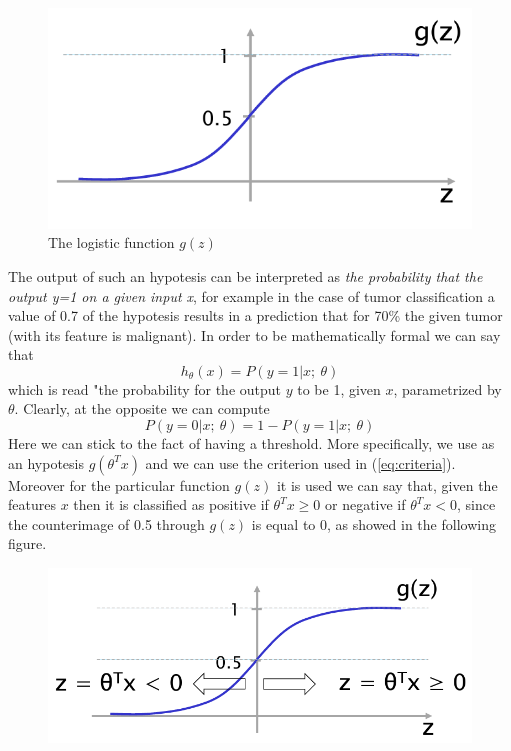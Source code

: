 \begin{figure}[h]
    \centering
    \includegraphics[scale=0.7]{img/logit.png}
    \caption{The logistic function $g(z)$}
\end{figure}

The output of such an hypotesis can be interpreted as \textit{the probability that the output y=1 on a given input x}, for example in the case of tumor classification a value of 0.7 of the hypotesis results in a prediction that for 70\% the given tumor (with its feature is malignant). In order to be mathematically formal we can say that 
\begin{equation}
    h_\theta(x)=P(y=1 | x; \ \theta )
\end{equation}
which is read "the probability for the output $y$ to be 1, given $x$, parametrized by $\theta$. Clearly, at the opposite we can compute
\begin{equation}
    P(y=0 | x; \ \theta) = 1 -P(y=1 | x; \ \theta )
\end{equation}
Here we can stick to the fact of having a threshold. More specifically, we use as an hypotesis $g(\theta^T{x})$ and we can use the criterion used in (\ref{eq:criteria}). Moreover for the particular function  $g(z)$ it is used we can say that, given the features $x$ then it is classified as positive if $\theta^T{x}\ge0$ or negative if $\theta^T{x}<0$, since the counterimage of 0.5 through $g(z)$ is equal to 0, as showed in the following figure.

\begin{figure}[h]
    \centering
    \includegraphics[scale=0.7]{img/logit2.png}
\end{figure}

